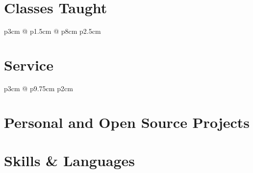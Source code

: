 \documentclass[10pt]{article}
\begin{document}
\section{Classes Taught}
\newcommand{\class}[4]{#3 & #1 & #4 \textcolor{lightg}{\dotfill} & #2 \\}
{\renewcommand*{\arraystretch}{1.33}
\begin{longtable}[l]{p{3cm} @{\hspace{0.5em}\textcolor{lightg}{}\hspace{0.5em}} p{1.5cm} @{\hspace{0.5em}\hspace{0.5em}} p{8cm} p{2.5cm}}
  \classes
\end{longtable}}

\section{Service}
\newcommand{\service}[3]{
  #1 & #2 \textcolor{lightg}{\dotfill} & #3\\
}
{\renewcommand*{\arraystretch}{1.33}
\begin{longtable}[l]{p{3cm} @{\hspace{0.5em}\textcolor{lightg}{}\hspace{0.5em}} p{9.75cm} p{2cm}}
  \servicelist
\end{longtable}}

\section{Personal and Open Source Projects}

\newcommand{\proj}[3]{
\begin{normalsize}
  \begin{large}\textsc{#1}\end{large} | \href{http://www.#3}{#3}
  \\
  \begin{small}\textcolor{darkg}{#2}\end{small}
\end{normalsize}

\vspace{0.5\baselineskip}}

\cockpit
\befungepy
\termdo
\matsciseg
\ratiocontour
\digitalcollation

\begin{minipage}{\linewidth}
  \section{Skills \& Languages}
  \setlength{\columnsep}{-3ex}
  \begin{multicols}{5}
    \raggedcolumns
    \begin{itemize}[leftmargin=*]
      \renewcommand{\labelitemi}{}
      \renewcommand{\skill}{\textnormal}
      \setlength{\itemsep}{1pt}
      \setlength{\parskip}{0pt}
      \setlength{\parsep}{0pt}
      \skillsListLong
    \end{itemize}
  \end{multicols}
  \skillsLegend
\end{minipage}
\end{document}
